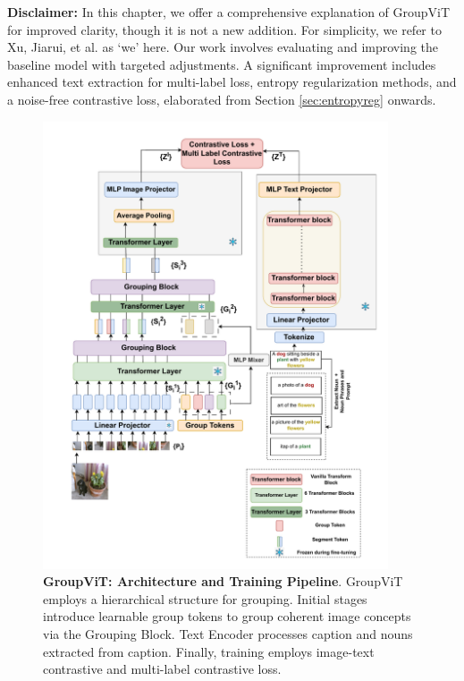 \textbf{Disclaimer:} In this chapter, we offer a comprehensive explanation of GroupViT for improved clarity, though it is not a new addition. For simplicity, we refer to Xu, Jiarui, et al. as `we' here. Our work involves evaluating and improving the baseline model with targeted adjustments. A significant improvement includes enhanced text extraction for multi-label loss, entropy regularization methods, and a noise-free contrastive loss, elaborated from Section \ref{sec:entropyreg} onwards.



\begin{figure}[tbh!]
  \centering
  \includegraphics[width=0.91\textwidth]{Images/gvitarch.drawio (5).pdf}
  \caption[\textbf{GroupViT: Architecture and Training Pipeline}]{\textbf{GroupViT: Architecture and Training Pipeline}. GroupViT employs a hierarchical structure for grouping. Initial stages introduce learnable group tokens to group coherent image concepts via the Grouping Block. Text Encoder processes caption and nouns extracted from caption. Finally, training employs image-text contrastive and multi-label contrastive loss. }
  \label{fig:gvitarch}
\end{figure}


